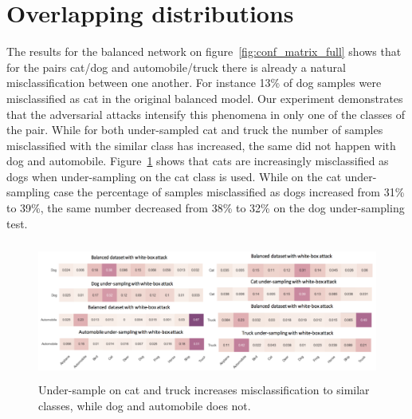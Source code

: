 \section{Overlapping distributions}
The results for the balanced network on figure~\ref{fig:conf_matrix_full} shows that for the pairs cat/dog and automobile/truck there is already a natural misclassification between one another. For instance 13\% of dog samples were misclassified as cat in the original balanced model. Our experiment demonstrates that the adversarial attacks intensify this phenomena in only one of the classes of the pair. While for both under-sampled cat and truck the number of samples misclassified with the similar class has increased, the same did not happen with dog and automobile. Figure~\ref{fig:overlap} shows that cats are increasingly misclassified as dogs when under-sampling on the cat class is used. While on the cat under-sampling case the percentage of samples misclassified as dogs increased from 31\% to 39\%, the same number decreased from 38\% to 32\% on the dog under-sampling test.
\begin{figure}
	\centering
	\includegraphics[height=4.5cm]{overlapping_all.png}
	\caption{Under-sample on cat and truck increases misclassification to similar classes, while dog and automobile does not.}
	\label{fig:overlap}
\end{figure}